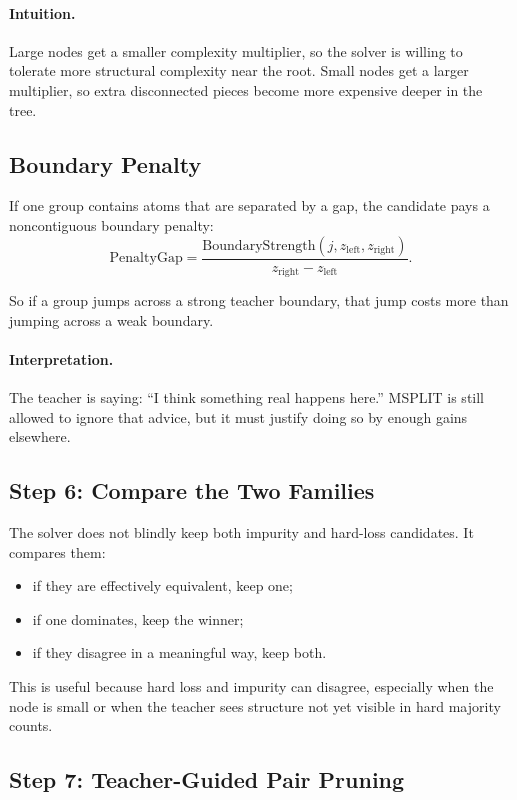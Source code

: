 \documentclass[11pt]{article}
\begin{document}
\paragraph{Intuition.}
Large nodes get a smaller complexity multiplier, so the solver is willing to tolerate more structural complexity near the root. Small nodes get a larger multiplier, so extra disconnected pieces become more expensive deeper in the tree.

\subsection{Boundary Penalty}

If one group contains atoms that are separated by a gap, the candidate pays a noncontiguous boundary penalty:
\[
\mathrm{PenaltyGap}
=
\frac{
\mathrm{BoundaryStrength}(j, z_{\mathrm{left}}, z_{\mathrm{right}})
}{
z_{\mathrm{right}} - z_{\mathrm{left}}
}.
\]

So if a group jumps across a strong teacher boundary, that jump costs more than jumping across a weak boundary.

\paragraph{Interpretation.}
The teacher is saying: ``I think something real happens here.'' MSPLIT is still allowed to ignore that advice, but it must justify doing so by enough gains elsewhere.

\subsection{Step 6: Compare the Two Families}

The solver does not blindly keep both impurity and hard-loss candidates. It compares them:

\begin{itemize}
\item if they are effectively equivalent, keep one;
\item if one dominates, keep the winner;
\item if they disagree in a meaningful way, keep both.
\end{itemize}

This is useful because hard loss and impurity can disagree, especially when the node is small or when the teacher sees structure not yet visible in hard majority counts.

\subsection{Step 7: Teacher-Guided Pair Pruning}
\end{document}
